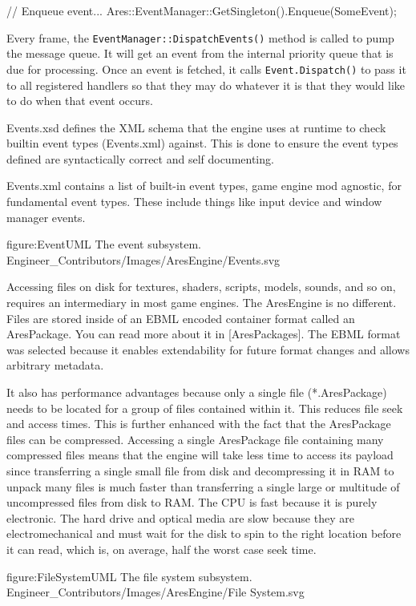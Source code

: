 // Enqueue event...
Ares::EventManager::GetSingleton().Enqueue(SomeEvent);
\stopCodeExample

Every frame, the {\tt EventManager::DispatchEvents()} method is called to pump the message queue. It will get an event from the internal priority queue that is due for processing. Once an event is fetched, it calls {\tt Event.Dispatch()} to pass it to all registered handlers so that they may do whatever it is that they would like to do when that event occurs.

Events.xsd defines the XML schema that the engine uses at runtime to check builtin event types (Events.xml) against. This is done to ensure the event types defined are syntactically correct and self documenting.

Events.xml contains a list of built-in event types, game engine mod agnostic, for fundamental event types. These include things like input device and window manager events.

\FullPageDiagram
    {figure:EventUML}
    {The event subsystem.}
    {Engineer_Contributors/Images/AresEngine/Events.svg}

\page 
{}
Accessing files on disk for textures, shaders, scripts, models, sounds, and so on, requires an intermediary in most game engines. The AresEngine is no different. Files are stored inside of an EBML encoded container format called an AresPackage. You can read more about it in [AresPackages]. The EBML format was selected because it enables extendability for future format changes and allows arbitrary metadata. 

It also has performance advantages because only a single file (*.AresPackage) needs to be located for a group of files contained within it. This reduces file seek and access times. This is further enhanced with the fact that the AresPackage files can be compressed. Accessing a single AresPackage file containing many compressed files means that the engine will take less time to access its payload since transferring a single small file from disk and decompressing it in RAM to unpack many files is much faster than transferring a single large or multitude of uncompressed files from disk to RAM. The CPU is fast because it is purely electronic. The hard drive and optical media are slow because they are electromechanical and must wait for the disk to spin to the right location before it can read, which is, on average, half the worst case seek time.

\FullPageDiagram
    {figure:FileSystemUML}
    {The file system subsystem.}
    {Engineer_Contributors/Images/AresEngine/File System.svg}

